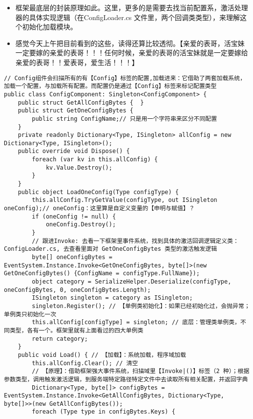 \documentclass[9pt, b5paper]{article}
\begin{document}
\begin{itemize}
\item 框架最底层的封装原理如此。这里，更多的是需要去找当前配置系，激活处理器的具体实现逻辑（在ConfigLoader.cs 文件里，两个回调类类型），来理解这个初始化加载模块。
\item 感觉今天上午把目前看到的这些，读得还算比较透彻。【亲爱的表哥，活宝妹一定要嫁的亲爱的表哥！！！任何时候，亲爱的表哥的活宝妹就是一定要嫁给亲爱的表哥！！爱表哥，爱生活！！！】
\end{itemize}
\begin{verbatim}
// Config组件会扫描所有的有【Config】标签的配置,加载进来：它借助了两套加载系统，加载一个配置，与加载所有配置。而配置仍是通过【Config】标签来标记配置类型
public class ConfigComponent: Singleton<ConfigComponent> {
    public struct GetAllConfigBytes {  }
    public struct GetOneConfigBytes {
        public string ConfigName;// 只是用一个字符串来区分不同配置 
    }
    private readonly Dictionary<Type, ISingleton> allConfig = new Dictionary<Type, ISingleton>();
    public override void Dispose() {
        foreach (var kv in this.allConfig) {
            kv.Value.Destroy();
        }
    }
    public object LoadOneConfig(Type configType) {
        this.allConfig.TryGetValue(configType, out ISingleton oneConfig);// oneConfig：这里算是自定义变量的【申明与赋值】？
        if (oneConfig != null) {
            oneConfig.Destroy();
        } 
        // 跟进Invoke: 去看一下框架里事件系统，找到具体的激活回调逻辑定义类：ConfigLoader.cs, 去查看里面对 GetOneConfigBytes 类型的激活触发逻辑
        byte[] oneConfigBytes = EventSystem.Instance.Invoke<GetOneConfigBytes, byte[]>(new GetOneConfigBytes() {ConfigName = configType.FullName});
        object category = SerializeHelper.Deserialize(configType, oneConfigBytes, 0, oneConfigBytes.Length);
        ISingleton singleton = category as ISingleton;
        singleton.Register(); // 【单例类初始化】：如果已经初始化过，会抛异常；单例类只初始化一次
        this.allConfig[configType] = singleton; // 底层：管理类单例类，不同类型，各有一个。框架里就有上面看过的四大单例类
        return category;
    }
    public void Load() { // 【加载】：系统加载，程序域加载 
        this.allConfig.Clear(); // 清空
        // 【原理】：借助框架强大事件系统，扫描域里【Invoke|()】标签（2 种）；根据参数类型，调用触发激活逻辑，到服务端特定路径特定文件中去读取所有相关配置，并返回字典
        Dictionary<Type, byte[]> configBytes = EventSystem.Instance.Invoke<GetAllConfigBytes, Dictionary<Type, byte[]>>(new GetAllConfigBytes());
        foreach (Type type in configBytes.Keys) {

\end{verbatim}
\end{document}
